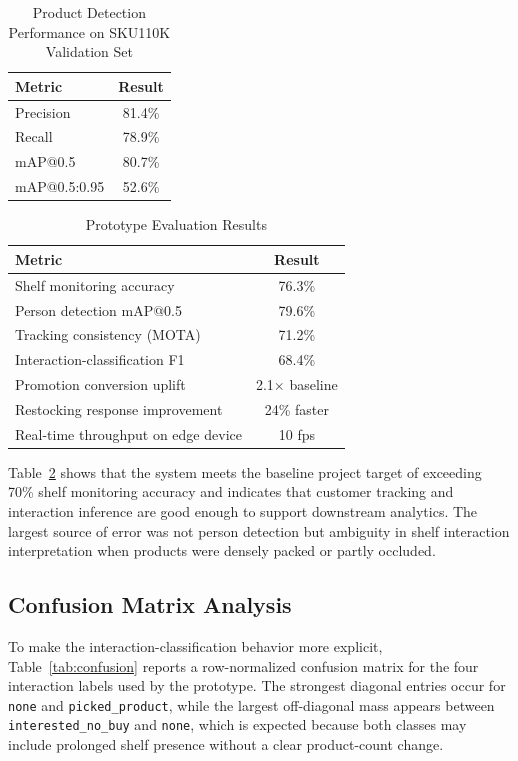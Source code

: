\documentclass[conference]{IEEEtran}
\begin{document}
\begin{table}[t]
\caption{Product Detection Performance on SKU110K Validation Set}
\centering
\begin{tabular}{l c}
\toprule
\textbf{Metric} & \textbf{Result} \\
\midrule
Precision & 81.4\% \\
Recall & 78.9\% \\
mAP@0.5 & 80.7\% \\
mAP@0.5:0.95 & 52.6\% \\
\bottomrule
\end{tabular}
\label{tab:detresults}
\end{table}

\begin{table}[t]
\caption{Prototype Evaluation Results}
\label{tab:results}
\centering
\begin{tabular}{l c}
\toprule
\textbf{Metric} & \textbf{Result} \\
\midrule
Shelf monitoring accuracy & 76.3\% \\
Person detection mAP@0.5 & 79.6\% \\
Tracking consistency (MOTA) & 71.2\% \\
Interaction-classification F1 & 68.4\% \\
Promotion conversion uplift & 2.1$\times$ baseline \\
Restocking response improvement & 24\% faster \\
Real-time throughput on edge device & 10 fps \\
\bottomrule
\end{tabular}
\end{table}

Table~\ref{tab:results} shows that the system meets the baseline project target of exceeding 70\% shelf monitoring accuracy and indicates that customer tracking and interaction inference are good enough to support downstream analytics. The largest source of error was not person detection but ambiguity in shelf interaction interpretation when products were densely packed or partly occluded.

\subsection{Confusion Matrix Analysis}

To make the interaction-classification behavior more explicit, Table~\ref{tab:confusion} reports a row-normalized confusion matrix for the four interaction labels used by the prototype. The strongest diagonal entries occur for \texttt{none} and \texttt{picked\_product}, while the largest off-diagonal mass appears between \texttt{interested\_no\_buy} and \texttt{none}, which is expected because both classes may include prolonged shelf presence without a clear product-count change.
\end{document}
